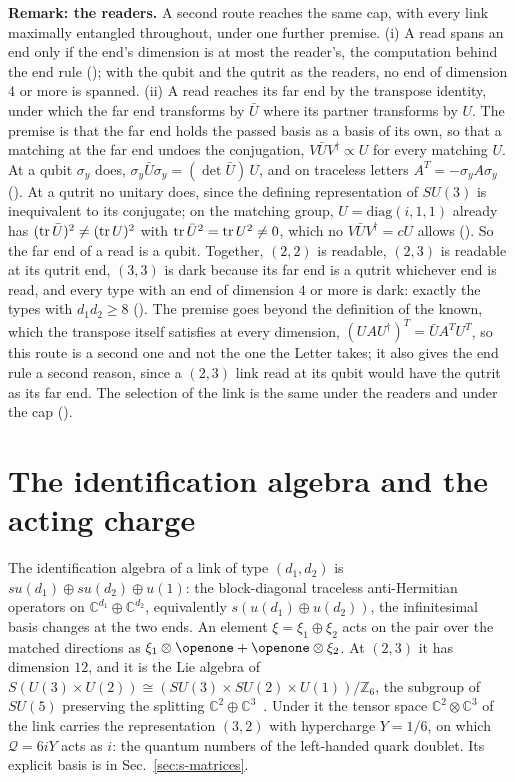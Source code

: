 \textbf{Remark: the readers.} A second route reaches the same cap, with every link maximally entangled throughout, under one further premise. (i) A read spans an end only if the end's dimension is at most the reader's, the computation behind the end rule (); with the qubit and the qutrit as the readers, no end of dimension $4$ or more is spanned. (ii) A read reaches its far end by the transpose identity, under which the far end transforms by $\bar{U}$ where its partner transforms by $U$. The premise is that the far end holds the passed basis as a basis of its own, so that a matching at the far end undoes the conjugation, $V\bar{U}V^{\dagger}\propto U$ for every matching $U$. At a qubit $\sigma_{y}$ does, $\sigma_{y}\bar{U}\sigma_{y}=(\det\bar{U})\,U$, and on traceless letters $A^{T}=-\sigma_{y}A\sigma_{y}$ (). At a qutrit no unitary does, since the defining representation of $SU(3)$ is inequivalent to its conjugate; on the matching group, $U=\mathrm{diag}(i,1,1)$ already has $(\operatorname{tr}\bar{U})^{2}\neq(\operatorname{tr} U)^{2}$ with $\operatorname{tr}\bar{U}^{2}=\operatorname{tr} U^{2}\neq 0$, which no $V\bar{U}V^{\dagger}=cU$ allows (). So the far end of a read is a qubit. Together, $(2,2)$ is readable, $(2,3)$ is readable at its qutrit end, $(3,3)$ is dark because its far end is a qutrit whichever end is read, and every type with an end of dimension $4$ or more is dark: exactly the types with $d_{1}d_{2}\geq 8$ (). The premise goes beyond the definition of the known, which the transpose itself satisfies at every dimension, $(UAU^{\dagger})^{T}=\bar{U}A^{T}U^{T}$, so this route is a second one and not the one the Letter takes; it also gives the end rule a second reason, since a $(2,3)$ link read at its qubit would have the qutrit as its far end. The selection of the link is the same under the readers and under the cap ().

\section{The identification algebra and the acting charge}
\label{sec:s-charge}

The identification algebra of a link of type $(d_{1},d_{2})$ is $su(d_{1})\oplus su(d_{2})\oplus u(1)$: the block-diagonal traceless anti-Hermitian operators on $\mathbb{C}^{d_{1}}\oplus\mathbb{C}^{d_{2}}$, equivalently $s(u(d_{1})\oplus u(d_{2}))$, the infinitesimal basis changes at the two ends. An element $\xi=\xi_{1}\oplus\xi_{2}$ acts on the pair over the matched directions as $\xi_{1}\otimes\openone+\openone\otimes\xi_{2}$. At $(2,3)$ it has dimension $12$, and it is the Lie algebra of $S(U(3)\times U(2))\cong(SU(3)\times SU(2)\times U(1))/\mathbb{Z}_{6}$, the subgroup of $SU(5)$ preserving the splitting $\mathbb{C}^{2}\oplus\mathbb{C}^{3}$~\cite{baez2010}. Under it the tensor space $\mathbb{C}^{2}\otimes\mathbb{C}^{3}$ of the link carries the representation $(3,2)$ with hypercharge $Y=1/6$, on which $\mathcal{Q}=6iY$ acts as $i$: the quantum numbers of the left-handed quark doublet. Its explicit basis is in Sec.~\ref{sec:s-matrices}.

